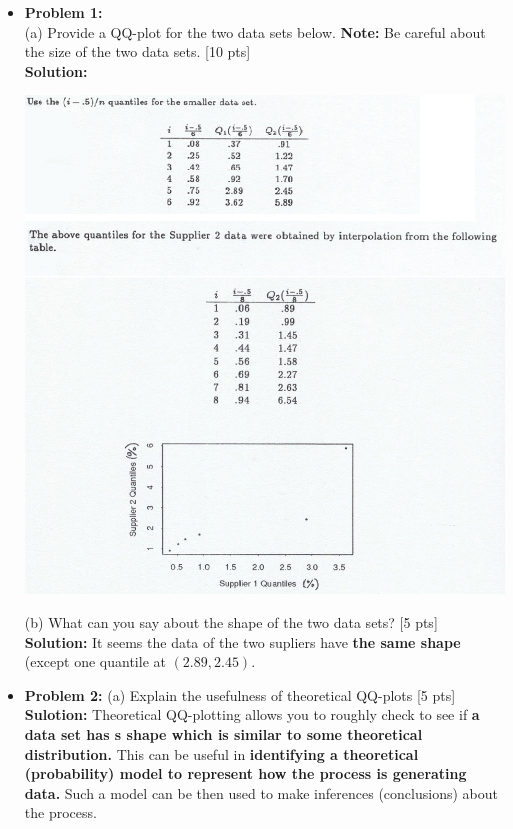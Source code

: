 \documentclass[11pt]{article}\usepackage[]{graphicx}\usepackage[]{color}
\begin{document}
\pagestyle{fancy} 
\begin{itemize}
\item \textbf{Problem 1:} \\ %
(a) Provide a QQ-plot for the two data sets below. \textbf{Note:} Be careful about the size of the two data sets. [10 pts] \\
\textbf{Solution:}\\
\begin{center}
	\begin{minipage}{\linewidth}
		\centering
		\includegraphics[width=\textwidth]{hw3p1.png}
	\end{minipage}
\end{center}

(b) What can you say about the shape of the two data sets? [5 pts]\\
\textbf{Solution:} It seems the data of the two supliers have \textbf{ the same shape} (except one  quantile at $(2.89, 2.45)$. 

\item \textbf{Problem 2:} (a) Explain the usefulness of theoretical QQ-plots  [5 pts]\\
\textbf{Sulotion:} Theoretical QQ-plotting allows you to roughly check to see if \textbf{a data set has s shape which is similar to some theoretical distribution.} This can be useful in \textbf{identifying a theoretical (probability) model to represent how the process is generating data. } Such a model can be then used to make inferences (conclusions) about the process. \\


\end{itemize}
\end{document}
